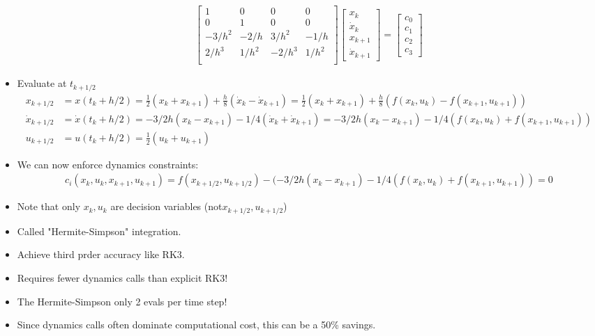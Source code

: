 \begin{itemize}
\begin{align}
\begin{bmatrix}
            1 & 0 & 0 & 0 \\
            0 & 1 & 0 & 0 \\
            -3/h^2 & -2/h & 3/h^2 & -1/h \\
            2/h^3 & 1/h^2 & -2/h^3 & 1/h^2 \\
        \end{bmatrix}
        \begin{bmatrix}
            x_k \\ \dot x_k \\ x_{k+1} \\ \dot x_{k+1}
        \end{bmatrix} =
        \begin{bmatrix}
            c_0 \\ c_1 \\ c_2 \\ c_3
        \end{bmatrix}  
    \end{align}
    \item Evaluate at $t_{k+1/2}$
    \begin{align}
        x_{k+1/2} &= x(t_k + h/2) = \frac{1}{2}(x_k + x_{k+1}) + \frac{h}{8}(\dot x_k - \dot x_{k+1}) = \frac{1}{2}(x_k + x_{k+1}) + \frac{h}{8}(f(x_k, u_k) - f(x_{k+1}, u_{k+1})) \\
        \dot x_{k+1/2} &= \dot x(t_k + h/2) = -3/2h (x_k - x_{k+1}) - 1/4(\dot x_k + \dot x_{k+1}) = -3/2h(x_k - x_{k+1}) - 1/4(f(x_k, u_k) + f(x_{k+1}, u_{k+1})) \\
        u_{k+1/2} &= u(t_k + h/2) = \frac{1}{2}(u_k + u_{k+1})
    \end{align}
    \item We can now enforce dynamics constraints:
    \begin{align}
        c_i(x_k, u_k, x_{k+1}, u_{k+1}) = f(x_{k+1/2}, u_{k+1/2}) - (-3/2h(x_k - x_{k+1}) - 1/4(f(x_k, u_k) + f(x_{k+1}, u_{k+1})) = 0
    \end{align}
    \item Note that only $x_k, u_k$ are decision variables (not$x_{k+1/2}, u_{k+1/2}$)
    \item Called "Hermite-Simpson" integration.
    \item Achieve third prder accuracy like RK3.
    \item Requires fewer dynamics calls than explicit RK3!
    \item The Hermite-Simpson only 2 evals per time step!
    \item Since dynamics calls often dominate computational cost, this can be a 50\% savings.
\end{itemize}


